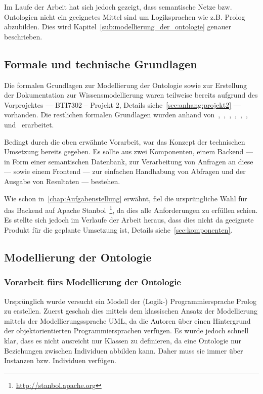 Im Laufe der Arbeit hat sich jedoch gezeigt, dass semantische Netze bzw. Ontologien nicht ein geeignetes Mittel sind um Logiksprachen wie z.B. Prolog abzubilden. Dies wird Kapitel~\autoref{sub:modellierung_der_ontologie} genauer beschrieben.

\subsection{Formale und technische Grundlagen}
\label{sub:formale_und_technische_grundlagen}
Die formalen Grundlagen zur Modellierung der Ontologie sowie zur Erstellung der Dokumentation zur Wissensmodellierung waren teilweise bereits aufgrund des Vorprojektes --- BTI7302 -- Projekt 2, Details siehe~\autoref{sec:anhang:projekt2} --- vorhanden. Die restlichen formalen Grundlagen wurden anhand von~\cite{IspekOntoBedeutung},~\cite{ISpekOntoGeschichte},~\cite{w3sparql_querylang},~\cite{w3sparql_overview},~\cite{w3rdf_syntax},~\cite{w3rdf},~\cite{w3owl} und~\cite{swrl} erarbeitet.

Bedingt durch die oben erwähnte Vorarbeit, war das Konzept der technischen Umsetzung bereits gegeben. Es sollte aus zwei Komponenten, einem Backend --- in Form einer semantischen Datenbank, zur Verarbeitung von Anfragen an diese --- sowie einem Frontend --- zur einfachen Handhabung von Abfragen und der Ausgabe von Resultaten --- bestehen.

Wie schon in~\autoref{chap:Aufgabenstellung} erwähnt, fiel die ursprüngliche Wahl für das Backend auf Apache Stanbol~\footnote{\url{http://stanbol.apache.org}}, da dies alle Anforderungen zu erfüllen schien. Es stellte sich jedoch im Verlaufe der Arbeit heraus, dass dies nicht da geeignete Produkt für die geplante Umsetzung ist, Details siehe~\autoref{sec:komponenten}.

\subsection{Modellierung der Ontologie}
\label{sub:modellierung_der_ontologie}

\subsubsection{Vorarbeit fürs Modellierung der Ontologie}
\label{sub:modellierung_der_ontologie_vorarbeit}
Ursprünglich wurde versucht ein Modell der (Logik-) Programmiersprache Prolog zu erstellen. Zuerst geschah dies mittels dem klassischen Ansatz der Modellierung mittels der Modellierungssprache UML, da die Autoren über einen Hintergrund der objektorientierten Programmiersprachen verfügen. Es wurde jedoch schnell klar, dass es nicht ausreicht nur Klassen zu definieren, da eine Ontologie nur Beziehungen zwischen Individuen abbilden kann. Daher muss sie immer über Instanzen bzw. Individuen verfügen.

